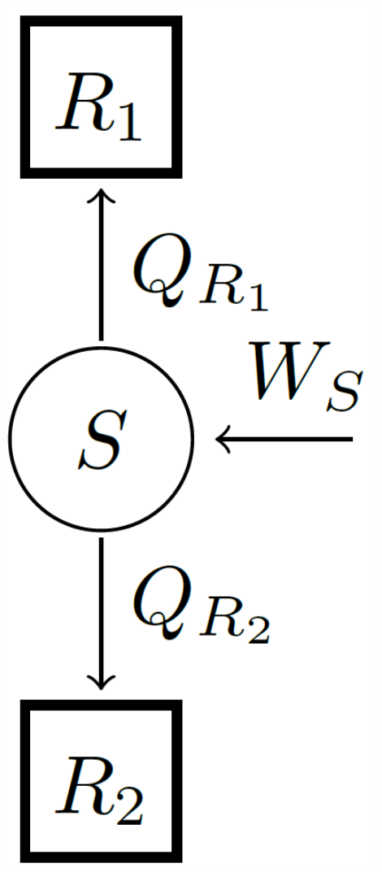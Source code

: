 \begin{minipage}{0.09\textwidth}
    \begin{center}
        \includegraphics[width=0.9\textwidth]{Bilder/Carnot_Thm.png}
    \end{center}
\end{minipage} \hspace{2pt}
